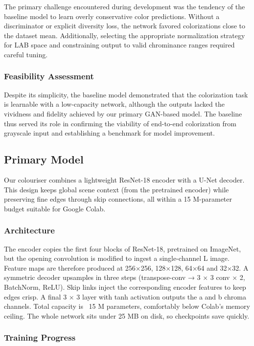 \documentclass{article} %
\begin{document}
The primary challenge encountered during development was the tendency of the baseline model to learn overly conservative color predictions. Without a discriminator or explicit 
diversity loss, the network favored colorizations close to the dataset mean. Additionally, selecting the appropriate normalization strategy for LAB space and constraining output to 
valid chrominance ranges required careful tuning.

\subsubsection{Feasibility Assessment}

Despite its simplicity, the baseline model demonstrated that the colorization task is learnable with a low-capacity network, although the outputs lacked the vividness and fidelity 
achieved by our primary GAN-based model. The baseline thus served its role in confirming the viability of end-to-end colorization from grayscale input and establishing a benchmark 
for model improvement.

\subsection{Primary Model}

Our colouriser combines a lightweight ResNet-18 encoder with a U-Net decoder. This design keeps global scene context (from the pretrained encoder) while preserving fine edges through skip connections, all within a 15 M-parameter budget suitable for Google Colab.

\subsubsection{Architecture}

The encoder copies the first four blocks of ResNet-18, pretrained on ImageNet, but the opening convolution is modified to ingest a single-channel L image. Feature maps are therefore produced at 256×256, 128×128, 64×64 and 32×32.
A symmetric decoder upsamples in three steps (transpose-conv → 3 × 3 conv × 2, BatchNorm, ReLU). Skip links inject the corresponding encoder features to keep edges crisp. A final 3 × 3 layer with tanh activation outputs the a and b chroma channels. Total capacity is ~15 M parameters, comfortably below Colab’s memory ceiling. The whole network sits under 25 MB on disk, so checkpoints save quickly.

\subsubsection{Training Progress}
\end{document}
